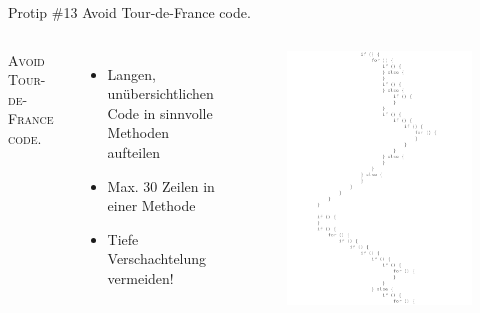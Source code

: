 \documentclass[18pt]{beamer}
\begin{document}
\begin{frame}{Protip \#13 Avoid Tour-de-France code.}
    \begin{columns}[c]
        \begin{block}{}
            \center
            \textsc{Avoid Tour-de-France code.}
        \end{block}
        \begin{itemize}
            \item Langen, unübersichtlichen Code in sinnvolle Methoden aufteilen
            \item Max. 30 Zeilen in einer Methode
            \item Tiefe Verschachtelung vermeiden!
        \end{itemize}
        \begin{figure}
            \includegraphics[scale=.3]{img/tourdefrancecode1.png}
        \end{figure}
    \end{columns}
\end{frame}
\end{document}
